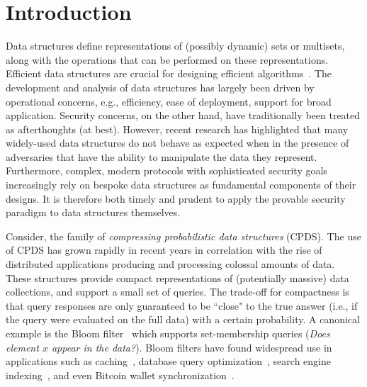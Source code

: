 \chapter{Introduction}

Data structures define representations of (possibly dynamic) sets or multisets, along with the operations that can be performed on these representations. Efficient data structures are crucial for designing efficient algorithms~\cite{clrs}. The development and analysis of data structures has largely been driven by operational concerns, e.g., efficiency, ease of deployment, support for broad application. Security concerns, on the other hand, have traditionally been treated as afterthoughts (at best). However, recent research has highlighted that many widely-used data structures do not behave as expected when in the presence of adversaries that have the ability to manipulate the data they represent. Furthermore, complex, modern protocols with sophisticated security goals increasingly rely on bespoke data structures as fundamental components of their designs. It is therefore both timely and prudent to apply the provable security paradigm to data structures themselves.


Consider, the family of \emph{compressing probabilistic data structures} (CPDS). The use of CPDS has grown rapidly in recent years in correlation with the rise of distributed applications producing and processing colossal amounts of data. These structures provide compact representations of (potentially massive) data collections, and support a small set of queries.  The trade-off for compactness is that query responses are only guaranteed to be ``close" to the true answer (i.e., if the query were evaluated on the full data) with a certain probability. A canonical example is the Bloom filter~\cite{bloom1970space} which supports set-membership queries (\emph{Does element $x$ appear in the data?}).  Bloom filters have found widespread use in applications such as caching~\cite{maggs2015}, database query optimization~\cite{dean2006}, search engine indexing~\cite{goodwin2017bitfunnel}, and even Bitcoin wallet synchronization~\cite{bip-0037}.

